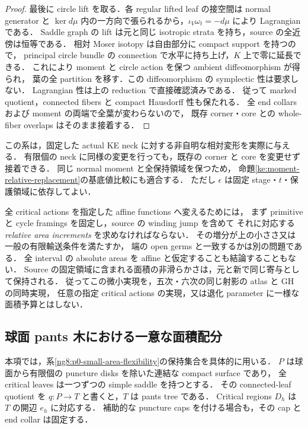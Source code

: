 \begin{proof}
最後に circle lift を取る．各 regular lifted leaf の接空間は normal generator と
$\ker d\mu$ 内の一方向で張られるから，$\iota_V\omega_t=-d\mu$ により Lagrangian である．
Saddle graph の lift は元と同じ isotropic strata を持ち，source の全近傍は恒等である．
相対 Moser isotopy は自由部分に compact support を持つので，
principal circle bundle の connection で水平に持ち上げ，$K$ 上で零に延長できる．
これにより moment と circle action を保つ ambient diffeomorphism が得られ，
葉の全 partition を移す．この diffeomorphism の symplectic 性は要求しない．
Lagrangian 性は上の reduction で直接確認済みである．
従って marked quotient，connected fibers と compact Hausdorff 性も保たれる．
全 end collars および moment の両端で全葉が変わらないので，
既存 corner・core との whole-fiber overlaps はそのまま接着する．
\end{proof}

\begin{remark}
\label{ng8:p0-area-scope}
この系は，固定した actual KE neck に対する非自明な相対変形を実際に与える．
有限個の neck に同様の変更を行っても，既存の corner と core を変更せず接着できる．
同じ normal moment と全保持領域を保つため，
命題\ref{ke:moment-relative-replacement}の基底値比較にも適合する．
ただし $\epsilon$ は固定 stage・$t$・保護領域に依存してよい．

全 critical actions を指定した affine functions へ変えるためには，
まず primitive と cycle framings を固定し，source の winding jump を含めて
それに対応する \emph{relative area increments} を求めなければならない．
その増分が上の小ささ又は一般の有限輸送条件を満たすか，
端の open germs と一致するかは別の問題である．
全 interval の absolute areas を affine と仮定することも結論することもない．
Source の固定領域に含まれる面積の非滑らかさは，元と新で同じ寄与として保持される．
従ってこの微小実現を，五次・六次の同じ射影の atlas と GH の同時実現，
任意の指定 critical actions の実現，又は退化 parameter に一様な面積予算とはしない．
\end{remark}

\subsection{球面 pants 木における一意な面積配分}
\label{ng8:spherical-tree-area}

本項では，系\ref{ng8:p0-small-area-flexibility}の保持集合を具体的に用いる．
$P$ は球面から有限個の puncture disks を除いた連結な compact surface であり，
全 critical leaves は一つずつの simple saddle を持つとする．
その connected-leaf quotient を $q:P\to T$ と書くと，$T$ は pants tree である．
Critical regions $D_h$ は $T$ の開辺 $e_h$ に対応する．
補助的な puncture caps を付ける場合も，その cap と end collar は固定する．

